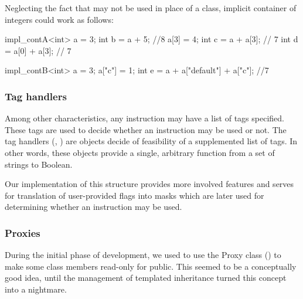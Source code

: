  Neglecting the fact that  may not be used in place of a class, implicit container of integers could work as follows:
\mybeginfig
\begin{code}
impl_contA<int> a = 3;
int b = a + 5; //8
a[3] = 4;
int c = a + a[3]; // 7
int d = a[0] + a[3]; // 7

impl_contB<int> a = 3;
a["c"] = 1;
int e = a + a["default"] + a["c"]; //7
\end{code}

\subsubsection{Tag handlers}
  Among other characteristics, any instruction may have a list of tags specified. These tags are used to decide whether an instruction may be used or not. The tag handlers (, ) are objects decide of feasibility of a supplemented list of tags. In other words, these objects provide a single, arbitrary function from a set of strings to Boolean.

  Our implementation of this structure provides more involved features and serves for translation of user-provided flags into masks which are later used for determining whether an instruction may be used.

\subsubsection{Proxies}
  During the initial phase of development, we used to use the Proxy class () to make some class members read-only for public. This seemed to be a conceptually good idea, until the management of templated inheritance turned this concept into a nightmare. 

